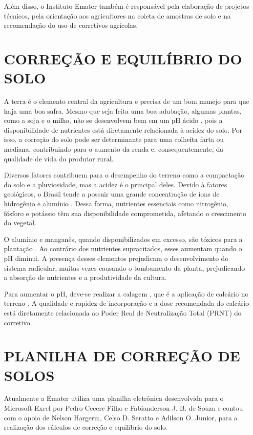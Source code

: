Além disso, o Instituto Emater também é responsável pela elaboração de projetos técnicos, pela orientação aos agricultores na coleta de amostras de solo e na recomendação do uso de corretivos agrícolas.

\section{CORREÇÃO E EQUILÍBRIO DO SOLO}
\label{subsec:correcaodosolo}

A terra é o elemento central da agricultura e precisa de um bom manejo para que haja uma boa safra. Mesmo que seja feita uma boa adubação, algumas plantas, como a soja e o milho, não se desenvolvem bem em um pH ácido \cite{de2003sugestao}, pois a disponibilidade de nutrientes está diretamente relacionada à acidez do solo. Por isso, a correção do solo pode ser determinante para uma colheita farta ou mediana, contribuindo para o aumento da renda e, consequentemente, da qualidade de vida do produtor rural.

Diversos fatores contribuem para o desempenho do terreno como a compactação do solo e a pluviosidade, mas a acidez é o principal deles. Devido à fatores geológicos, o Brasil tende a possuir uma grande concentração de íons de hidrogênio e alumínio \cite{bookfa2215c6}. Dessa forma, nutrientes essenciais como nitrogênio, fósforo e potássio têm sua disponibilidade comprometida, afetando o crescimento do vegetal.

O alumínio e manganês, quando disponibilizados em excesso, são tóxicos para a plantação \cite{malavolta1980effects}. Ao contrário dos nutrientes supracitados, esses aumentam quando o pH diminui. A presença desses elementos prejudicam o desenvolvimento do sistema radicular, muitas vezes causando o tombamento da planta, prejudicando a absorção de nutrientes e a produtividade da cultura.

Para aumentar o pH, deve-se realizar a calagem , que é a aplicação de calcário no terreno \cite{rossetto}. A qualidade e rapidez de incorporação e a dose recomendada do calcário está diretamente relacionada ao Poder Real de Neutralização Total (PRNT) do corretivo.

\section{PLANILHA DE CORREÇÃO DE SOLOS}
\label{subsec:planilha}

Atualmente a Emater utiliza uma planilha eletrônica desenvolvida para o Microsoft Excel por Pedro Cecere Filho e Fabianderson J. B. de Souza e contou com o apoio de Nelson Hargerm, Celso D. Seratto e Adilson O. Junior, para a realização dos cálculos de correção e equilíbrio do solo.

